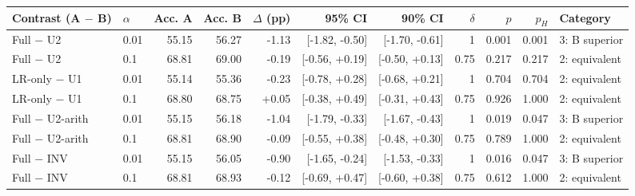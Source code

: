 \begin{tabular}{llrrrrrrrrl}
\toprule
Contrast (A $-$ B) & $\alpha$ & Acc. A & Acc. B & $\Delta$ (pp) & 95\% CI & 90\% CI & $\delta$ & $p$ & $p_H$ & Category \\
\midrule
Full $-$ U2 & 0.01 & 55.15 & 56.27 & -1.13 & [-1.82, -0.50] & [-1.70, -0.61] & 1 & 0.001 & 0.001 & 3: B superior \\
Full $-$ U2 & 0.1 & 68.81 & 69.00 & -0.19 & [-0.56, +0.19] & [-0.50, +0.13] & 0.75 & 0.217 & 0.217 & 2: equivalent \\
\addlinespace
LR-only $-$ U1 & 0.01 & 55.14 & 55.36 & -0.23 & [-0.78, +0.28] & [-0.68, +0.21] & 1 & 0.704 & 0.704 & 2: equivalent \\
LR-only $-$ U1 & 0.1 & 68.80 & 68.75 & +0.05 & [-0.38, +0.49] & [-0.31, +0.43] & 0.75 & 0.926 & 1.000 & 2: equivalent \\
\addlinespace
Full $-$ U2-arith & 0.01 & 55.15 & 56.18 & -1.04 & [-1.79, -0.33] & [-1.67, -0.43] & 1 & 0.019 & 0.047 & 3: B superior \\
Full $-$ U2-arith & 0.1 & 68.81 & 68.90 & -0.09 & [-0.55, +0.38] & [-0.48, +0.30] & 0.75 & 0.789 & 1.000 & 2: equivalent \\
\addlinespace
Full $-$ INV & 0.01 & 55.15 & 56.05 & -0.90 & [-1.65, -0.24] & [-1.53, -0.33] & 1 & 0.016 & 0.047 & 3: B superior \\
Full $-$ INV & 0.1 & 68.81 & 68.93 & -0.12 & [-0.69, +0.47] & [-0.60, +0.38] & 0.75 & 0.612 & 1.000 & 2: equivalent \\
\bottomrule
\end{tabular}
